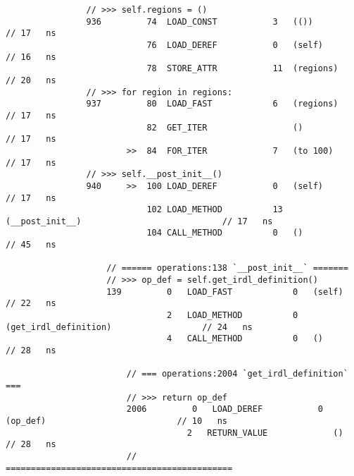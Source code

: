 \begin{code}
\begin{verbatim}
                // >>> self.regions = ()
                936         74  LOAD_CONST           3   (())                                       // 17   ns
                            76  LOAD_DEREF           0   (self)                                     // 16   ns
                            78  STORE_ATTR           11  (regions)                                  // 20   ns
                // >>> for region in regions:
                937         80  LOAD_FAST            6   (regions)                                  // 17   ns
                            82  GET_ITER                 ()                                         // 17   ns
                        >>  84  FOR_ITER             7   (to 100)                                   // 17   ns
                // >>> self.__post_init__()
                940     >>  100 LOAD_DEREF           0   (self)                                     // 17   ns
                            102 LOAD_METHOD          13  (__post_init__)                            // 17   ns
                            104 CALL_METHOD          0   ()                                         // 45   ns

                    // ====== operations:138 `__post_init__` =======
                    // >>> op_def = self.get_irdl_definition()
                    139         0   LOAD_FAST            0   (self)                                 // 22   ns
                                2   LOAD_METHOD          0   (get_irdl_definition)                  // 24   ns
                                4   CALL_METHOD          0   ()                                     // 28   ns

                        // === operations:2004 `get_irdl_definition` ===
                        // >>> return op_def
                        2006         0   LOAD_DEREF           0   (op_def)                          // 10   ns
                                    2   RETURN_VALUE             ()                                 // 28   ns
                        // =============================================


\end{verbatim}
\end{code}
